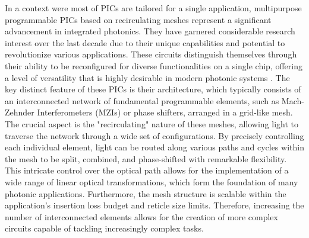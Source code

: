 In a context were most of PICs are tailored for a single application, multipurpose programmable PICs based on recirculating meshes represent a significant advancement in integrated photonics.
They have garnered considerable research interest over the last decade due to their unique capabilities and potential to revolutionize various applications.
These circuits distinguish themselves through their ability to be reconfigured for diverse functionalities on a single chip, offering a level of versatility that is highly desirable in modern photonic systems \cite{bogaerts_programmable_2020,capmany_programmable_2020,perez_multipurpose_2017}.
The key distinct feature of these PICs is their architecture, which typically consists of an interconnected network of fundamental programmable elements, such as Mach-Zehnder Interferometers (MZIs) or phase shifters, arranged in a grid-like mesh.
The crucial aspect is the "recirculating" nature of these meshes, allowing light to traverse the network through a wide set of configurations.
By precisely controlling each individual element, light can be routed along various paths and cycles within the mesh to be split, combined, and phase-shifted with remarkable flexibility.
This intricate control over the optical path allows for the implementation of a wide range of linear optical transformations, which form the foundation of many photonic applications.
Furthermore, the mesh structure is scalable within the application's insertion loss budget and reticle size limits.
Therefore, increasing the number of interconnected elements allows for the creation of more complex circuits capable of tackling increasingly complex tasks.

